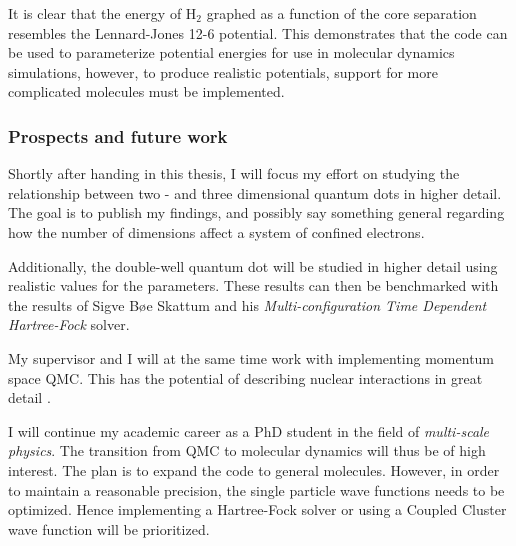 It is clear that the energy of $\mathrm{H_2}$ graphed as a function of the core separation resembles the Lennard-Jones 12-6 potential. This demonstrates that the code can be used to parameterize potential energies for use in molecular dynamics simulations, however, to produce realistic potentials, support for more complicated molecules must be implemented. 

\subsubsection{Prospects and future work}

Shortly after handing in this thesis, I will focus my effort on studying the relationship between two - and three dimensional quantum dots in higher detail. The goal is to publish my findings, and possibly say something general regarding how the number of dimensions affect a system of confined electrons.

Additionally, the double-well quantum dot will be studied in higher detail using realistic values for the parameters. These results can then be benchmarked with the results of Sigve Bøe Skattum and his \textit{Multi-configuration Time Dependent Hartree-Fock} solver.

My supervisor and I will at the same time work with implementing momentum space QMC. This has the potential of describing nuclear interactions in great detail \cite{momentspaceQMC}. 

I will continue my academic career as a PhD student in the field of \textit{multi-scale physics}. The transition from QMC to molecular dynamics will thus be of high interest. The plan is to expand the code to general molecules. However, in order to maintain a reasonable precision, the single particle wave functions needs to be optimized. Hence implementing a Hartree-Fock solver \cite{Shavitt} or using a Coupled Cluster wave function \cite{CCSD_WF} will be prioritized.


